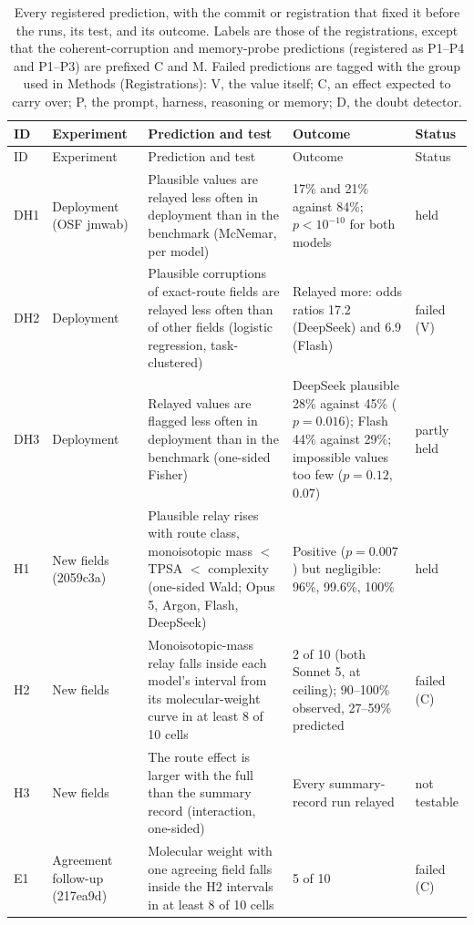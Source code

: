 \clearpage
\setlength{\LTcapwidth}{\textwidth}
\begin{footnotesize}
\begin{longtable}{p{0.8cm}p{2.0cm}p{6.0cm}p{4.8cm}p{1.2cm}}
\caption{Every registered prediction, with the commit or registration that fixed it before the runs, its test, and its outcome. Labels are those of the registrations, except that the coherent-corruption and memory-probe predictions (registered as P1--P4 and P1--P3) are prefixed C and M. Failed predictions are tagged with the group used in Methods (Registrations): V, the value itself; C, an effect expected to carry over; P, the prompt, harness, reasoning or memory; D, the doubt detector.}\\
\toprule
ID & Experiment & Prediction and test & Outcome & Status \\
\midrule
\endfirsthead
\toprule
ID & Experiment & Prediction and test & Outcome & Status \\
\midrule
\endhead
\bottomrule
\endfoot
DH1 & Deployment (OSF jmwab) & Plausible values are relayed less often in deployment than in the benchmark (McNemar, per model) & 17\% and 21\% against 84\%; $p<10^{-10}$ for both models & held \\
DH2 & Deployment & Plausible corruptions of exact-route fields are relayed less often than of other fields (logistic regression, task-clustered) & Relayed more: odds ratios 17.2 (DeepSeek) and 6.9 (Flash) & failed (V) \\
DH3 & Deployment & Relayed values are flagged less often in deployment than in the benchmark (one-sided Fisher) & DeepSeek plausible 28\% against 45\% ($p=0.016$); Flash 44\% against 29\%; impossible values too few ($p=0.12$, $0.07$) & partly held \\
H1 & New fields (2059c3a) & Plausible relay rises with route class, monoisotopic mass $<$ TPSA $<$ complexity (one-sided Wald; Opus 5, Argon, Flash, DeepSeek) & Positive ($p=0.007$) but negligible: 96\%, 99.6\%, 100\% & held \\
H2 & New fields & Monoisotopic-mass relay falls inside each model's interval from its molecular-weight curve in at least 8 of 10 cells & 2 of 10 (both Sonnet 5, at ceiling); 90--100\% observed, 27--59\% predicted & failed (C) \\
H3 & New fields & The route effect is larger with the full than the summary record (interaction, one-sided) & Every summary-record run relayed & not testable \\
E1 & Agreement follow-up (217ea9d) & Molecular weight with one agreeing field falls inside the H2 intervals in at least 8 of 10 cells & 5 of 10 & failed (C) \\

\end{longtable}
\end{footnotesize}
